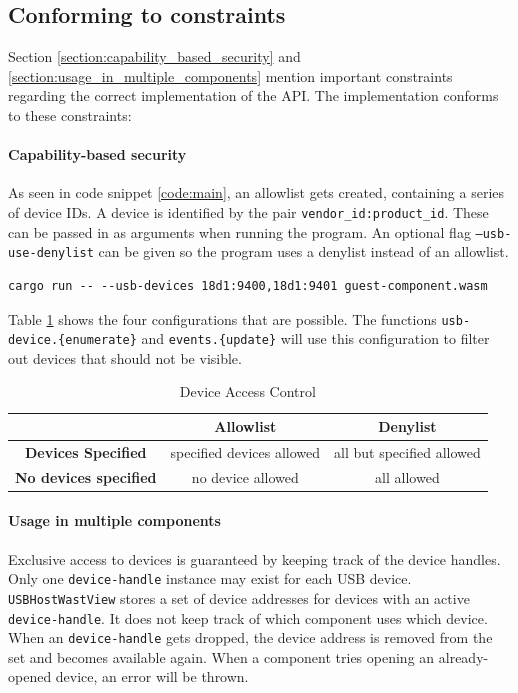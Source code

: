 \subsection{Conforming to constraints}
Section \ref{section:capability_based_security} and \ref{section:usage_in_multiple_components} mention important constraints regarding the correct implementation of the API. The implementation conforms to these constraints:

\paragraph{Capability-based security}
As seen in code snippet \ref{code:main}, an allowlist gets created, containing a series of device IDs. A device is identified by the pair \texttt{vendor\_id:product\_id}. These can be passed in as arguments when running the program. An optional flag \texttt{--usb-use-denylist} can be given so the program uses a denylist instead of an allowlist.

\begin{verbatim}
cargo run -- --usb-devices 18d1:9400,18d1:9401 guest-component.wasm
\end{verbatim}

Table \ref{table:allowlist} shows the four configurations that are possible. The functions \texttt{usb-device.\{enumerate\}} and \texttt{events.\{update\}} will use this configuration to filter out devices that should not be visible.

\begin{table}[h!]
\centering
\begin{tabular}{|c|c|c|}
\hline
& \textbf{Allowlist} & \textbf{Denylist} \\
\hline
\textbf{Devices Specified} & specified devices allowed & all but specified allowed \\
\hline
\textbf{No devices specified} & no device allowed & all allowed \\
\hline
\end{tabular}
\caption{Device Access Control}
\label{table:allowlist}
\end{table}

\paragraph{Usage in multiple components} Exclusive access to devices is guaranteed by keeping track of the device handles. Only one \texttt{device-handle} instance may exist for each \acrshort{USB} device. \texttt{USBHostWastView} stores a set of device addresses for devices with an active \texttt{device-handle}. It does not keep track of which component uses which device. When an \texttt{device-handle} gets dropped, the device address is removed from the set and becomes available again. When a component tries opening an already-opened device, an error will be thrown. 

